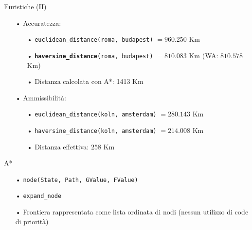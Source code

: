 \documentclass{beamer}
\begin{document}
        \begin{frame}{Euristiche (II)}
        \begin{itemize}
            \item[•] Accuratezza:
            \begin{itemize}
                \item[•] {\tt\footnotesize euclidean\_distance(roma, budapest)} $= 960.250$ Km
                \item[•] {\tt\footnotesize \textbf{haversine\_distance}(roma, budapest)} $= 810.083$ Km (WA: $810.578$ Km)
                \item[•] Distanza calcolata con A*: 1413 Km
            \end{itemize}
            \item[•] Ammissibilità:
            \begin{itemize}
                \item[•] {\tt\footnotesize euclidean\_distance(koln, amsterdam)} $= 280.143$ Km
                \item[•] {\tt\footnotesize haversine\_distance(koln, amsterdam)} $= 214.008$ Km
                \item[•] Distanza effettiva: $258$ Km
            \end{itemize}
        \end{itemize}
   \end{frame}

    \begin{frame}{A*}
        \begin{itemize}
            \Large
            \item[•] {\tt node(State, Path, GValue, FValue)}
            \item[•] {\tt expand\_node}
            \item[•] Frontiera rappresentata come lista ordinata di nodi (nessun utilizzo di code di priorità)
        \end{itemize}
    \end{frame}
\end{document}
